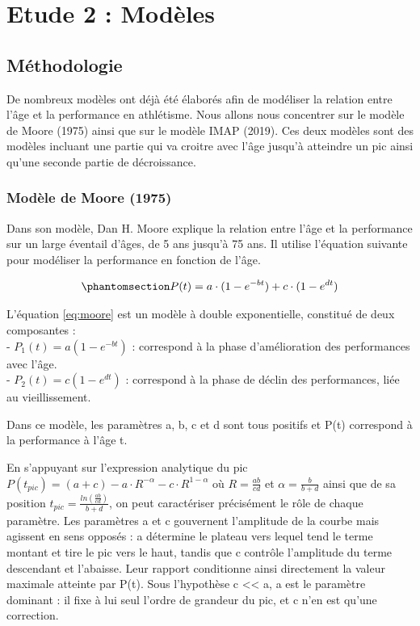 \documentclass[
  french,
  11pt,
  a4paper,
]{article}
\begin{document}
\newpage

\section{Etude 2 : Modèles}\label{etude-2-moduxe8les}

\subsection{Méthodologie}\label{muxe9thodologie-1}

De nombreux modèles ont déjà été élaborés afin de modéliser la relation
entre l'âge et la performance en athlétisme. Nous allons nous concentrer
sur le modèle de Moore (1975) ainsi que sur le modèle IMAP (2019). Ces
deux modèles sont des modèles incluant une partie qui va croitre avec
l'âge jusqu'à atteindre un pic ainsi qu'une seconde partie de
décroissance.

\subsubsection{Modèle de Moore (1975)}\label{moduxe8le-de-moore-1975}

Dans son modèle, Dan H. Moore explique la relation entre l'âge et la
performance sur un large éventail d'âges, de 5 ans jusqu'à 75 ans. Il
utilise l'équation suivante pour modéliser la performance en fonction de
l'âge.

\begin{equation}\phantomsection\label{eq-moore}{P(t) = a \cdot(1 - e^{-bt}) + c \cdot(1 - e^{dt})}\end{equation}

L'équation \eqref{eq:moore} est un modèle à double exponentielle,
constitué de deux composantes :\\
- \(P_1(t) = a(1 - e^{-bt})\) : correspond à la phase d'amélioration des
performances avec l'âge.\\
- \(P_2(t) = c(1 - e^{dt})\) : correspond à la phase de déclin des
performances, liée au vieillissement.

Dans ce modèle, les paramètres a, b, c et d sont tous positifs et P(t)
correspond à la performance à l'âge t.

En s'appuyant sur l'expression analytique du pic
\(P(t_{pic}) = (a+c) − a·R^{−α} − c·R^{1−α}\) où \(R = \frac {ab} {cd}\)
et \(\alpha = \frac {b} {b+d}\) ainsi que de sa position
\(t_{pic} = \frac {ln(\frac {ab} {cd})} {b+d}\), on peut caractériser
précisément le rôle de chaque paramètre. Les paramètres a et c
gouvernent l'amplitude de la courbe mais agissent en sens opposés : a
détermine le plateau vers lequel tend le terme montant et tire le pic
vers le haut, tandis que c contrôle l'amplitude du terme descendant et
l'abaisse. Leur rapport conditionne ainsi directement la valeur maximale
atteinte par P(t). Sous l'hypothèse c \textless\textless{} a, a est le
paramètre dominant : il fixe à lui seul l'ordre de grandeur du pic, et c
n'en est qu'une correction.
\end{document}
